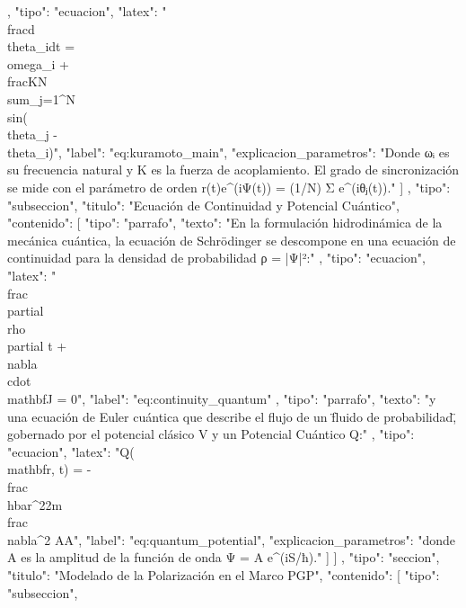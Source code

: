 \documentclass{article}
\begin{document}
{{{{            },
            {
              "tipo": "ecuacion",
              "latex": "\\frac{d\\theta_i}{dt} = \\omega_i + \\frac{K}{N} \\sum_{j=1}^{N} \\sin(\\theta_j - \\theta_i)",
              "label": "eq:kuramoto_main",
              "explicacion_parametros": "Donde ωᵢ es su frecuencia natural y K es la fuerza de acoplamiento. El grado de sincronización se mide con el parámetro de orden r(t)e^(iΨ(t)) = (1/N) Σ e^(iθⱼ(t))."
            }
          ]
        },
        {
          "tipo": "subseccion",
          "titulo": "Ecuación de Continuidad y Potencial Cuántico",
          "contenido": [
            {
              "tipo": "parrafo",
              "texto": "En la formulación hidrodinámica de la mecánica cuántica, la ecuación de Schrödinger se descompone en una ecuación de continuidad para la densidad de probabilidad ρ = |Ψ|²:"
            },
            {
              "tipo": "ecuacion",
              "latex": "\\frac{\\partial \\rho}{\\partial t} + \\nabla \\cdot \\mathbf{J} = 0",
              "label": "eq:continuity_quantum"
            },
            {
              "tipo": "parrafo",
              "texto": "y una ecuación de Euler cuántica que describe el flujo de un \"fluido de probabilidad\", gobernado por el potencial clásico V y un Potencial Cuántico Q:"
            },
            {
              "tipo": "ecuacion",
              "latex": "Q(\\mathbf{r}, t) = -\\frac{\\hbar^2}{2m} \\frac{\\nabla^2 A}{A}",
              "label": "eq:quantum_potential",
              "explicacion_parametros": "donde A es la amplitud de la función de onda Ψ = A e^(iS/ħ)."
            }
          ]
        }
      ]
    },
    {
      "tipo": "seccion",
      "titulo": "Modelado de la Polarización en el Marco PGP",
      "contenido": [
        {
          "tipo": "subseccion",
}}}
\end{document}
